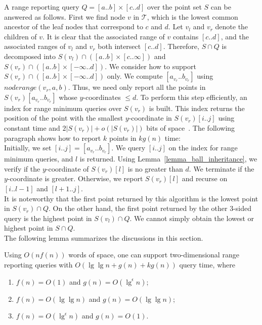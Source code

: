 \documentclass{llncs}
\begin{document}
\indent A range reporting query $Q = [a..b]\times[c..d]$ over the point set $S$ can be answered as follows.
First we find node $v$ in $\mathcal T$, which is the lowest common ancestor of the leaf nodes that correspond to $c$ and $d$.
Let $v_l$ and $v_r$ denote the children of $v$.
It is clear that the associated range of $v$ contains $[c..d]$,
and the associated ranges of $v_l$ and $v_r$ both intersect $[c..d]$.
Therefore, $S \cap Q$ is decomposed into $S(v_l) \cap ([a..b]\times [c..\infty])$ and $S(v_r) \cap ([a..b]\times [-\infty..d])$.
We consider how to support $S(v_r) \cap ([a..b]\times [-\infty..d])$ only.
We compute $[a_{v_r}..b_{v_r}]$ using $noderange(v_r, a, b)$.
Thus, we need only report all the points in $S(v_r)[a_{v_r}..b_{v_r}]$ whose $y$-coordinates $\leq d$.
To perform this step efficiently, an index for range minimum queries over $S(v_r)$ is built.
This index returns the position of the point with the smallest $y$-coordinate in $S(v_r)[i..j]$ using constant time
and $2|S(v_r)| + o(|S(v_r)|)$ bits of space~\cite{DBLP:journals/siamcomp/FischerH11}.
The following paragraph shows how to report $k$ points in $kg(n)$ time: \\
\indent Initially, we set $[i..j] = [a_{v_r}..b_{v_r}]$.
We query $[i..j]$ on the index for range minimum queries, and $l$ is returned.
Using Lemma~\ref{lemma_ball_inheritance}, we verify if the $y$-coordinate of $S(v_r)[l]$ is no greater than $d$.
We terminate if the $y$-coordinate is greater.
Otherwise, we report $S(v_r)[l]$ and recurse on $[i..l - 1]$ and $[l + 1..j]$. \\
\indent It is noteworthy that the first point returned by this algorithm is the lowest point in $S(v_r) \cap Q$.
On the other hand, the first point returned by the other 3-sided query is the highest point in $S(v_l) \cap Q$.
We cannot simply obtain the lowest or highest point in $S \cap Q$. \\
\indent The following lemma summarizes the discussions in this section.
\begin{lemma}
    \label{lemma_unsorted_range_reporting}
    Using $O(nf(n))$ words of space,
    one can support two-dimensional range reporting queries with $O(\lg\lg n + g(n) + k g(n))$ query time,
    where
    \begin{enumerate}
        \item $f(n) = O(1)$ and $g(n) = O(\lg^\epsilon n)$;
        \item $f(n) = O(\lg\lg n)$ and $g(n) = O(\lg\lg n)$;
        \item $f(n) = O(\lg^\epsilon n)$ and $g(n) = O(1)$.
    \end{enumerate}
\end{lemma}
\end{document}
